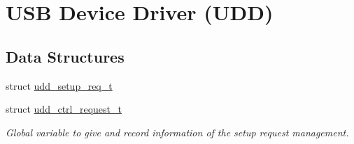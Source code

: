 \hypertarget{group__udd__group}{
\section{\-U\-S\-B \-Device \-Driver (\-U\-D\-D)}
\label{group__udd__group}
}
\subsection*{\-Data \-Structures}
\begin{DoxyCompactItemize}
\item 
struct \hyperlink{structudd__setup__req__t}{udd\-\_\-setup\-\_\-req\-\_\-t}
\item 
struct \hyperlink{structudd__ctrl__request__t}{udd\-\_\-ctrl\-\_\-request\-\_\-t}
\begin{DoxyCompactList}\small\item\em \-Global variable to give and record information of the setup request management. \end{DoxyCompactList}\end{DoxyCompactItemize}
